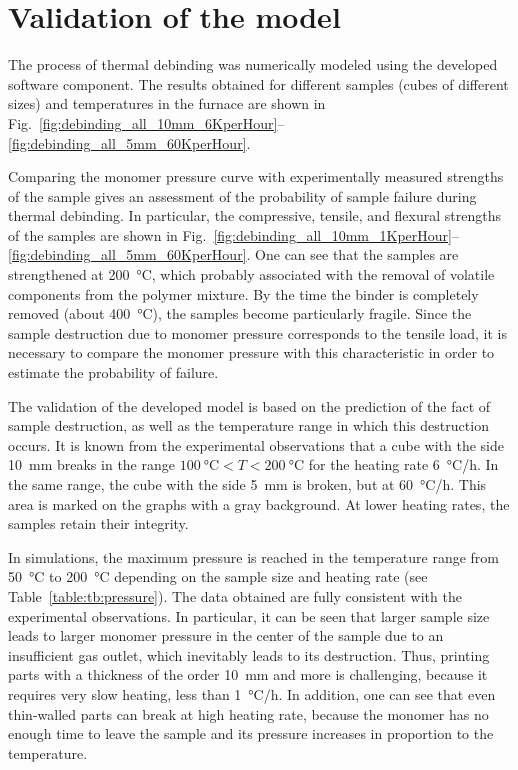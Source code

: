 \documentclass{article}
\begin{document}
\section{Validation of the model}

The process of thermal debinding was numerically modeled using the developed software component.
The results obtained for different samples (cubes of different sizes) and temperatures in the furnace are shown in Fig.~\ref{fig:debinding_all_10mm_6KperHour}--\ref{fig:debinding_all_5mm_60KperHour}.

Comparing the monomer pressure curve with experimentally measured strengths
of the sample gives an assessment of the probability of sample failure during thermal debinding.
In particular, the compressive, tensile, and flexural strengths of the samples
are shown in Fig.~\ref{fig:debinding_all_10mm_1KperHour}--\ref{fig:debinding_all_5mm_60KperHour}.
One can see that the samples are strengthened at \SI{200}{\celsius},
which probably associated with the removal of volatile components from the polymer mixture.
By the time the binder is completely removed (about \SI{400}{\celsius}),
the samples become particularly fragile.
Since the sample destruction due to monomer pressure corresponds to the tensile load,
it is necessary to compare the monomer pressure with this characteristic
in order to estimate the probability of failure.

The validation of the developed model is based on the prediction of the fact of sample destruction,
as well as the temperature range in which this destruction occurs.
It is known from the experimental observations that a cube with the side \SI{10}{\mm}
breaks in the range $\SI{100}{\celsius}<T<\SI{200}{\celsius}$ for the heating rate \SI{6}{\celsius/\hour}.
In the same range, the cube with the side \SI{5}{\mm} is broken, but at \SI{60}{\celsius/\hour}.
This area is marked on the graphs with a gray background.
At lower heating rates, the samples retain their integrity.

In simulations, the maximum pressure is reached in the temperature range
from \SI{50}{\celsius} to \SI{200}{\celsius}
depending on the sample size and heating rate (see Table~\ref{table:tb:pressure}).
The data obtained are fully consistent with the experimental observations.
In particular, it can be seen that larger sample size leads to larger monomer pressure 
in the center of the sample due to an insufficient gas outlet,
which inevitably leads to its destruction.
Thus, printing parts with a thickness of the order \SI{10}{\mm} and more is challenging,
because it requires very slow heating, less than \SI{1}{\celsius/\hour}.
In addition, one can see that even thin-walled parts can break at high heating rate,
because the monomer has no enough time to leave the sample
and its pressure increases in proportion to the temperature.
\end{document}
